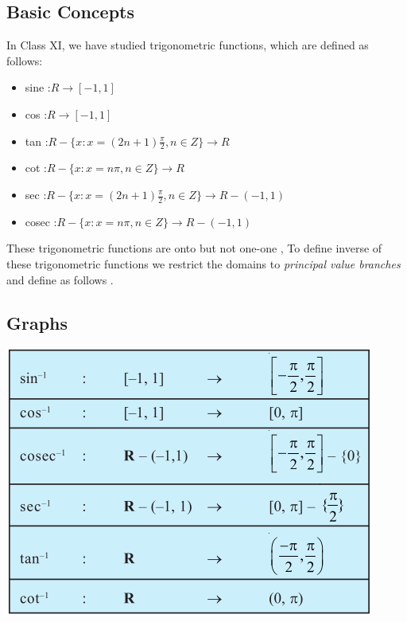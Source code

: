 \documentclass[12pt]{article}
\begin{document}
\begin{multicols}{2}
\subsection*{Basic Concepts }
In Class XI, we have studied trigonometric functions, which are defined as follows:
\begin{itemize}
    \item sine :$ R \rightarrow [-1,1]$
    \item cos :$ R \rightarrow [-1,1]$
    \item tan :$ R-\{x: x=(2n+1)\frac{\pi}{2}, n \in Z\} \rightarrow R$
    \item cot :$ R-\{x: x=n \pi, n \in Z\} \rightarrow R$
    \item sec :$ R-\{x: x=(2n+1)\frac{\pi}{2}, n \in Z\} \rightarrow R-(-1,1)$
    \item cosec :$ R-\{x: x=n \pi, n \in Z\} \rightarrow R-(-1,1)$
\end{itemize}

These trigonometric functions are onto but not one-one , To define inverse of these trigonometric functions we restrict the domains to \emph{
principal value
branches} and define as follows .


\subsection*{Graphs}
\includegraphics[scale=0.5]{1.png}


\end{multicols}
\end{document}

